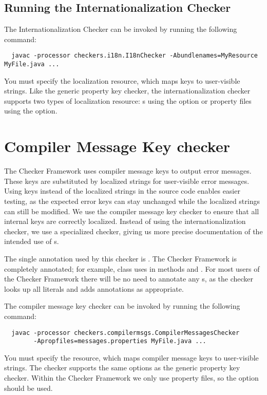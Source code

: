 \subsection{Running the Internationalization Checker\label{i18n-running}}

The Internationalization Checker can be invoked by running the following
command:

\begin{Verbatim}
  javac -processor checkers.i18n.I18nChecker -Abundlenames=MyResource MyFile.java ...
\end{Verbatim}

You must specify the localization resource, which maps keys to user-visible
strings.  Like the generic property key checker, the internationalization checker
supports two types of localization resource:
s using the 
 option
or property files using the
 option.



\section{Compiler Message Key checker\label{compilermsgs-checker}}

The Checker Framework uses compiler message keys to output error messages.
These keys are substituted by localized strings for user-visible error messages.
Using keys instead of the localized strings in the source code enables easier
testing, as the expected error keys can stay unchanged while the localized
strings can still be modified. 
We use the compiler message key checker to ensure that all internal
keys are correctly localized.
Instead of using the internationalization checker, we use a specialized checker,
giving us more precise documentation of the intended use of s.

The single annotation used by this checker is 
.
The Checker Framework is completely annotated;
for example, class 
uses  in methods  and .
For most users of the Checker Framework there will be no need to annotate any
s, as the checker looks up all  literals and adds
annotations as appropriate.

The compiler message key checker can be invoked by running the following
command:

\begin{Verbatim}
  javac -processor checkers.compilermsgs.CompilerMessagesChecker
        -Apropfiles=messages.properties MyFile.java ...
\end{Verbatim}

You must specify the resource, which maps compiler message keys to user-visible
strings.  The checker supports the same options as the generic property key checker.
Within the Checker Framework we only use property files,
so the  option should be used.
